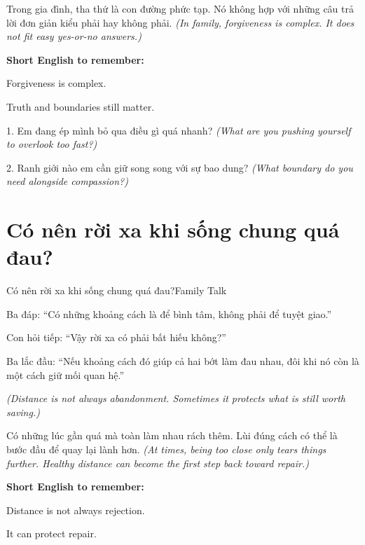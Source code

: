\begin{baihoc}
Trong gia đình, tha thứ là con đường phức tạp. Nó không hợp với những câu trả lời đơn giản kiểu phải hay không phải.
\textit{(In family, forgiveness is complex. It does not fit easy yes-or-no answers.)}
\end{baihoc}

\begin{ghinhoanh}
\textbf{Short English to remember:}

Forgiveness is complex.

Truth and boundaries still matter.
\end{ghinhoanh}

\begin{tuhocnhanh}
1. Em đang ép mình bỏ qua điều gì quá nhanh? \textit{(What are you pushing yourself to overlook too fast?)}

2. Ranh giới nào em cần giữ song song với sự bao dung? \textit{(What boundary do you need alongside compassion?)}
\end{tuhocnhanh}
\ngancach

\section{Có nên rời xa khi sống chung quá đau?}
\begin{truyen}{Có nên rời xa khi sống chung quá đau?}{Family Talk}

Ba đáp: ``Có những khoảng cách là để bình tâm, không phải để tuyệt giao.''

Con hỏi tiếp: ``Vậy rời xa có phải bất hiếu không?''

Ba lắc đầu: ``Nếu khoảng cách đó giúp cả hai bớt làm đau nhau, đôi khi nó còn là một cách giữ mối quan hệ.''

\textit{(Distance is not always abandonment. Sometimes it protects what is still worth saving.)}
\end{truyen}

\begin{baihoc}
Có những lúc gần quá mà toàn làm nhau rách thêm. Lùi đúng cách có thể là bước đầu để quay lại lành hơn.
\textit{(At times, being too close only tears things further. Healthy distance can become the first step back toward repair.)}
\end{baihoc}

\begin{ghinhoanh}
\textbf{Short English to remember:}

Distance is not always rejection.

It can protect repair.
\end{ghinhoanh}

